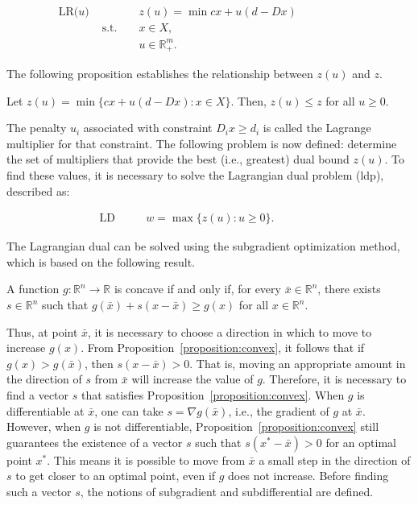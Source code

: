 \begin{align*}
	\text{LR($u$) } &              &  & z(u) = \min cx + u(d - Dx) &  &  &  &  &  &  & \\
	                & \text{s.t. } &  & x \in X,                   &  &  &  &  &  &  & \\
	                &              &  & u \in \mathbb{R}^m_+.      &  &  &  &  &  &  &
\end{align*}

The following proposition establishes the relationship between $z(u)$ and $z$.

\begin{proposition}
	Let $z(u) = \min \{cx + u (d - Dx) : x \in X\}$. Then, $z(u) \leq z$ for all $u \geq 0$.
\end{proposition}

The penalty $u_i$ associated with constraint $D_ix \geq d_i$ is called the
Lagrange multiplier for that constraint. The following problem is now defined:
determine the set of multipliers that provide the best (i.e., greatest) dual
bound $z(u)$. To find these values, it is necessary to solve the Lagrangian dual problem
(\gls{ldp}), described as:

\begin{align*}
	\text{LD } &  &  & w = \max \{z(u) : u \geq 0\}. &  &  &  &  &
\end{align*}

The Lagrangian dual can be solved using the subgradient optimization method,
which is based on the following result.

\begin{proposition} \label{proposition:convex}
	A function $g : \mathbb{R}^n \rightarrow \mathbb{R}$ is concave if and only if, for every $\bar{x} \in \mathbb{R}^n$, there exists $s \in \mathbb{R}^n$ such that $g(\bar{x}) + s(x - \bar{x}) \geq g(x)$ for all $x \in \mathbb{R}^n$.
\end{proposition}

Thus, at point $\bar{x}$, it is necessary to choose a direction in which to move
to increase $g(x)$. From Proposition~\ref{proposition:convex}, it follows that if
$g(x) > g(\bar{x})$, then $s(x - \bar{x}) > 0$. That is, moving an appropriate
amount in the direction of $s$ from $\bar{x}$ will increase the value of $g$.
Therefore, it is necessary to find a vector $s$ that satisfies
Proposition~\ref{proposition:convex}. When $g$ is differentiable at $\bar{x}$,
one can take $s = \nabla g(\bar{x})$, i.e., the gradient of $g$ at $\bar{x}$.
However, when $g$ is not differentiable, Proposition~\ref{proposition:convex}
still guarantees the existence of a vector $s$ such that $s(x^* - \bar{x}) > 0$
for an optimal point $x^*$. This means it is possible to move from $\bar{x}$ a
small step in the direction of $s$ to get closer to an optimal point, even if
$g$ does not increase. Before finding such a vector $s$, the notions of
subgradient and subdifferential are defined.

